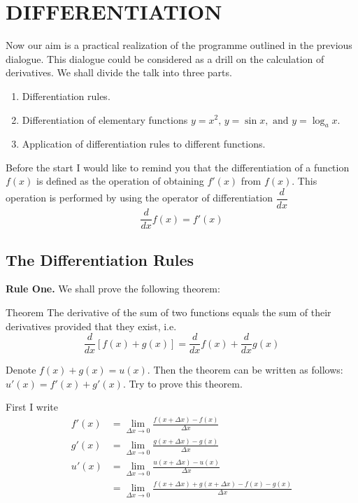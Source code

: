 

\chapter{DIFFERENTIATION}
\label{differentiation}

\athr Now our aim is a practical realization of the programme outlined in the previous dialogue. This dialogue could be considered as a drill on the calculation of derivatives. We shall divide the talk into three parts.
\begin{enumerate}
\item Differentiation rules.

\item Differentiation of elementary functions	$y = x^{2},	\, y	= \sin x, \,\, \text{and} \,\, y = \log_{a} x$. 
\item Application of differentiation rules to different functions.
\end{enumerate}

Before the start I would like to remind you that the differentiation of a function $f (x)$ is defined as the operation of obtaining $f' (x)$ from $f (x)$. This operation is performed by using the operator of differentiation $\dfrac{d}{dx}$
\begin{equation*}%
\frac{d}{dx} f(x) = f'(x)
\end{equation*}


\section*{The Differentiation Rules}
\label{diff-rules}

\athr \textbf{Rule One.} We shall prove the following theorem:
\begin{mytheo}{Theorem}
The derivative of the sum of two functions equals the sum of their derivatives provided that they exist, i.e.
\begin{equation}%
\frac{d}{dx} \left[f(x) + g(x) \right] = \frac{d}{dx} f(x)  + \frac{d}{dx} g(x) 
\label{deriv-sum}
\end{equation}
\end{mytheo}

Denote $f (x) + g (x) =u (x)$. Then the theorem can be written as follows: $u' (x) = f' (x) + g' (x)$. Try to prove this theorem.

\rdr First I write
\begin{align*}%
f' (x) & =\lim\limits_{\Delta x \to 0} \frac{f (x + \Delta x) - f(x)}{ \Delta x} \\
g' (x) & = \lim\limits_{\Delta x \to 0} \frac{g (x + \Delta x) - g(x)}{ \Delta x} \\
u'(x) & = \lim\limits_{\Delta x \to 0} \frac{u (x + \Delta x) - u(x)}{ \Delta x} \\
& = \lim\limits_{\Delta x \to 0}  \frac{f (x + \Delta x) + g (x + \Delta x) - f(x) - g(x)}{ \Delta x} \\
\end{align*}


